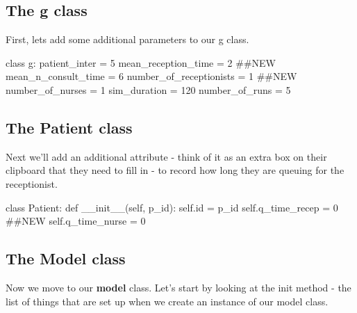 \documentclass[
  letterpaper,
  DIV=11,
  numbers=noendperiod]{scrreprt}
\newenvironment{Shaded}{\begin{snugshade}}{\end{snugshade}}
\newcommand{\BuiltInTok}[1]{\textcolor[rgb]{0.00,0.23,0.31}{#1}}
\newcommand{\CommentTok}[1]{\textcolor[rgb]{0.37,0.37,0.37}{#1}}
\newcommand{\DecValTok}[1]{\textcolor[rgb]{0.68,0.00,0.00}{#1}}
\newcommand{\FunctionTok}[1]{\textcolor[rgb]{0.28,0.35,0.67}{#1}}
\newcommand{\KeywordTok}[1]{\textcolor[rgb]{0.00,0.23,0.31}{#1}}
\newcommand{\NormalTok}[1]{\textcolor[rgb]{0.00,0.23,0.31}{#1}}
\newcommand{\OperatorTok}[1]{\textcolor[rgb]{0.37,0.37,0.37}{#1}}
\newcommand{\VariableTok}[1]{\textcolor[rgb]{0.07,0.07,0.07}{#1}}
\begin{document}
\subsection{The g class}\label{the-g-class}

First, lets add some additional parameters to our g class.

\begin{Shaded}
\begin{Highlighting}[]
\KeywordTok{class}\NormalTok{ g:}
\NormalTok{    patient\_inter }\OperatorTok{=} \DecValTok{5}
\NormalTok{    mean\_reception\_time }\OperatorTok{=} \DecValTok{2} \CommentTok{\#\#NEW}
\NormalTok{    mean\_n\_consult\_time }\OperatorTok{=} \DecValTok{6}
\NormalTok{    number\_of\_receptionists }\OperatorTok{=} \DecValTok{1} \CommentTok{\#\#NEW}
\NormalTok{    number\_of\_nurses }\OperatorTok{=} \DecValTok{1}
\NormalTok{    sim\_duration }\OperatorTok{=} \DecValTok{120}
\NormalTok{    number\_of\_runs }\OperatorTok{=} \DecValTok{5}
\end{Highlighting}
\end{Shaded}

\subsection{The Patient class}\label{the-patient-class}

Next we'll add an additional attribute - think of it as an extra box on
their clipboard that they need to fill in - to record how long they are
queuing for the receptionist.

\begin{Shaded}
\begin{Highlighting}[]
\KeywordTok{class}\NormalTok{ Patient:}
    \KeywordTok{def} \FunctionTok{\_\_init\_\_}\NormalTok{(}\VariableTok{self}\NormalTok{, p\_id):}
        \VariableTok{self}\NormalTok{.}\BuiltInTok{id} \OperatorTok{=}\NormalTok{ p\_id}
        \VariableTok{self}\NormalTok{.q\_time\_recep }\OperatorTok{=} \DecValTok{0} \CommentTok{\#\#NEW}
        \VariableTok{self}\NormalTok{.q\_time\_nurse }\OperatorTok{=} \DecValTok{0}
\end{Highlighting}
\end{Shaded}

\subsection{The Model class}\label{the-model-class}

Now we move to our \textbf{model} class. Let's start by looking at the
init method - the list of things that are set up when we create an
instance of our model class.
\end{document}
